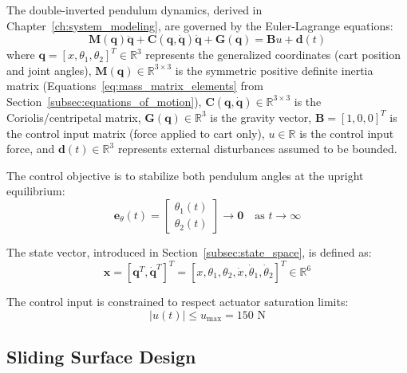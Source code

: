 The double-inverted pendulum dynamics, derived in Chapter~\ref{ch:system_modeling}, are governed by the Euler-Lagrange equations:
\begin{equation}
\label{eq:dip_dynamics}
\mathbf{M}(\mathbf{q})\ddot{\mathbf{q}} + \mathbf{C}(\mathbf{q}, \dot{\mathbf{q}})\dot{\mathbf{q}} + \mathbf{G}(\mathbf{q}) = \mathbf{B}u + \mathbf{d}(t)
\end{equation}
where $\mathbf{q} = [x, \theta_1, \theta_2]^T \in \mathbb{R}^3$ represents the generalized coordinates (cart position and joint angles), $\mathbf{M}(\mathbf{q}) \in \mathbb{R}^{3 \times 3}$ is the symmetric positive definite inertia matrix (Equations~\ref{eq:mass_matrix_elements} from Section~\ref{subsec:equations_of_motion}), $\mathbf{C}(\mathbf{q}, \dot{\mathbf{q}}) \in \mathbb{R}^{3 \times 3}$ is the Coriolis/centripetal matrix, $\mathbf{G}(\mathbf{q}) \in \mathbb{R}^3$ is the gravity vector, $\mathbf{B} = [1, 0, 0]^T$ is the control input matrix (force applied to cart only), $u \in \mathbb{R}$ is the control input force, and $\mathbf{d}(t) \in \mathbb{R}^3$ represents external disturbances assumed to be bounded.

The control objective is to stabilize both pendulum angles at the upright equilibrium:
\begin{equation}
\label{eq:control_objective}
\mathbf{e}_{\theta}(t) = \begin{bmatrix} \theta_1(t) \\ \theta_2(t) \end{bmatrix} \to \mathbf{0} \quad \text{as } t \to \infty
\end{equation}

The state vector, introduced in Section~\ref{subsec:state_space}, is defined as:
\begin{equation}
\label{eq:state_vector}
\mathbf{x} = [\mathbf{q}^T, \dot{\mathbf{q}}^T]^T = [x, \theta_1, \theta_2, \dot{x}, \dot{\theta}_1, \dot{\theta}_2]^T \in \mathbb{R}^6
\end{equation}

The control input is constrained to respect actuator saturation limits:
\begin{equation}
\label{eq:control_saturation}
|u(t)| \leq u_{\max} = 150 \text{ N}
\end{equation}

\subsection{Sliding Surface Design}
\label{subsec:sliding_surface}

